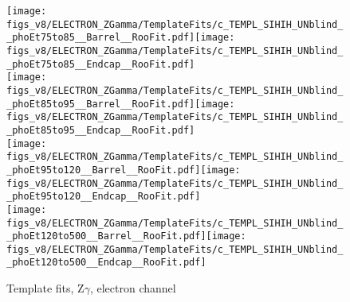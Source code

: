 \begin{figure}[htb]
  \begin{center}
   \texttt{[image: figs\_v8/ELECTRON\_ZGamma/TemplateFits/c\_TEMPL\_SIHIH\_UNblind\_\_phoEt75to85\_\_Barrel\_\_RooFit.pdf]}\texttt{[image: figs\_v8/ELECTRON\_ZGamma/TemplateFits/c\_TEMPL\_SIHIH\_UNblind\_\_phoEt75to85\_\_Endcap\_\_RooFit.pdf]}\\
   \texttt{[image: figs\_v8/ELECTRON\_ZGamma/TemplateFits/c\_TEMPL\_SIHIH\_UNblind\_\_phoEt85to95\_\_Barrel\_\_RooFit.pdf]}\texttt{[image: figs\_v8/ELECTRON\_ZGamma/TemplateFits/c\_TEMPL\_SIHIH\_UNblind\_\_phoEt85to95\_\_Endcap\_\_RooFit.pdf]}\\
   \texttt{[image: figs\_v8/ELECTRON\_ZGamma/TemplateFits/c\_TEMPL\_SIHIH\_UNblind\_\_phoEt95to120\_\_Barrel\_\_RooFit.pdf]}\texttt{[image: figs\_v8/ELECTRON\_ZGamma/TemplateFits/c\_TEMPL\_SIHIH\_UNblind\_\_phoEt95to120\_\_Endcap\_\_RooFit.pdf]}\\
   \texttt{[image: figs\_v8/ELECTRON\_ZGamma/TemplateFits/c\_TEMPL\_SIHIH\_UNblind\_\_phoEt120to500\_\_Barrel\_\_RooFit.pdf]}\texttt{[image: figs\_v8/ELECTRON\_ZGamma/TemplateFits/c\_TEMPL\_SIHIH\_UNblind\_\_phoEt120to500\_\_Endcap\_\_RooFit.pdf]}\\
  \label{fig:templateFits_SIHIH_ELECTRON_ZGamma_3}
  \caption{Template fits, Z$\gamma$, electron channel}
  \end{center}
\end{figure}




